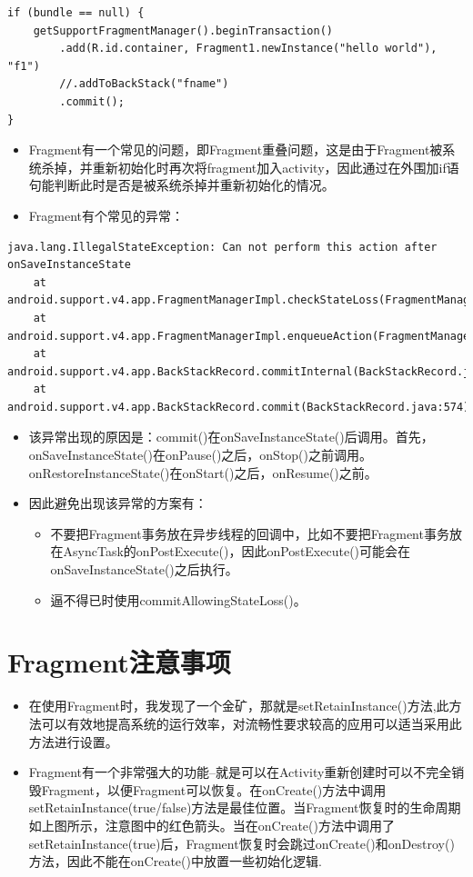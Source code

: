 \documentclass[9pt, b5paaper]{book}
\begin{document}
\begin{verbatim}
if (bundle == null) {
    getSupportFragmentManager().beginTransaction()
        .add(R.id.container, Fragment1.newInstance("hello world"), "f1")
        //.addToBackStack("fname")
        .commit();
}
\end{verbatim}
\begin{itemize}
\item Fragment有一个常见的问题，即Fragment重叠问题，这是由于Fragment被系统杀掉，并重新初始化时再次将fragment加入activity，因此通过在外围加if语句能判断此时是否是被系统杀掉并重新初始化的情况。
\item Fragment有个常见的异常：
\end{itemize}
\begin{verbatim}
java.lang.IllegalStateException: Can not perform this action after onSaveInstanceState
    at android.support.v4.app.FragmentManagerImpl.checkStateLoss(FragmentManager.java:1341)
    at android.support.v4.app.FragmentManagerImpl.enqueueAction(FragmentManager.java:1352)
    at android.support.v4.app.BackStackRecord.commitInternal(BackStackRecord.java:595)
    at android.support.v4.app.BackStackRecord.commit(BackStackRecord.java:574)
\end{verbatim}
\begin{itemize}
\item 该异常出现的原因是：commit()在onSaveInstanceState()后调用。首先，onSaveInstanceState()在onPause()之后，onStop()之前调用。onRestoreInstanceState()在onStart()之后，onResume()之前。
\item 因此避免出现该异常的方案有：
\begin{itemize}
\item 不要把Fragment事务放在异步线程的回调中，比如不要把Fragment事务放在AsyncTask的onPostExecute()，因此onPostExecute()可能会在onSaveInstanceState()之后执行。
\item 逼不得已时使用commitAllowingStateLoss()。
\end{itemize}
\end{itemize}

\section{Fragment注意事项}
\label{sec-2-10}
\begin{itemize}
\item 在使用Fragment时，我发现了一个金矿，那就是setRetainInstance()方法,此方法可以有效地提高系统的运行效率，对流畅性要求较高的应用可以适当采用此方法进行设置。
\item Fragment有一个非常强大的功能--就是可以在Activity重新创建时可以不完全销毁Fragment，以便Fragment可以恢复。在onCreate()方法中调用setRetainInstance(true/false)方法是最佳位置。当Fragment恢复时的生命周期如上图所示，注意图中的红色箭头。当在onCreate()方法中调用了setRetainInstance(true)后，Fragment恢复时会跳过onCreate()和onDestroy()方法，因此不能在onCreate()中放置一些初始化逻辑.
\end{itemize}
\end{document}
